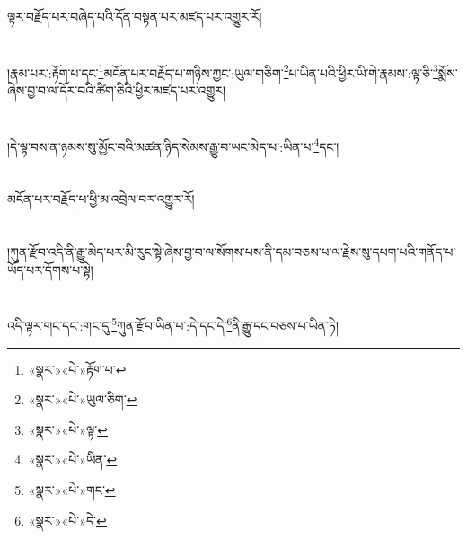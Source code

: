 ལྟར་བརྗོད་པར་བཞེད་པའི་དོན་བསྟན་པར་མཛད་པར་འགྱུར་རོ།\chapter{ }།རྣམ་པར་:རྟོག་པ་དང་\footnote{«སྣར་»«པེ་»རྟོག་པ་}མངོན་པར་བརྗོད་པ་གཉིས་ཀྱང་:ཡུལ་གཅིག་\footnote{«སྣར་»«པེ་»ཡུལ་ཅིག་}པ་ཡིན་པའི་ཕྱིར་ཡི་གེ་རྣམས་:ལྟ་ཅི་\footnote{«སྣར་»«པེ་»ལྟ་}སྨོས་ཞེས་བྱ་བ་ལ་དོར་བའི་ཚིག་ཅིའི་ཕྱིར་མཛད་པར་འགྱུར།\chapter{ }།དེ་ལྟ་བས་ན་ཉམས་སུ་མྱོང་བའི་མཚན་ཉིད་སེམས་རྒྱུ་བ་ཡང་མེད་པ་:ཡིན་པ་\footnote{«སྣར་»«པེ་»ཡིན་}དང་།\chapter{ }མངོན་པར་བརྗོད་པ་ཕྱི་མ་འབྲེལ་བར་འགྱུར་རོ།\chapter{ }།ཀུན་རྫོབ་འདི་ནི་རྒྱུ་མེད་པར་མི་རུང་སྟེ་ཞེས་བྱ་བ་ལ་སོགས་པས་ནི་དམ་བཅས་པ་ལ་རྗེས་སུ་དཔག་པའི་གནོད་པ་ཡོད་པར་དོགས་པ་སྟེ།\chapter{ }འདི་ལྟར་གང་དང་:གང་དུ་\footnote{«སྣར་»«པེ་»གང་}ཀུན་རྫོབ་ཡིན་པ་:དེ་དང་དེ་\footnote{«སྣར་»«པེ་»དེ་}ནི་རྒྱུ་དང་བཅས་པ་ཡིན་ཏེ།\